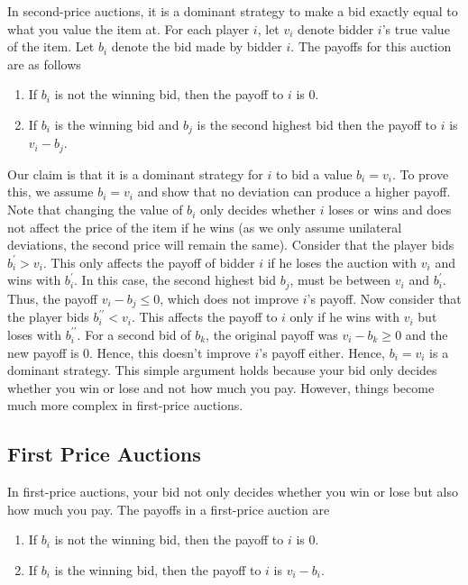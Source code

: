 \documentclass{article}
\theoremstyle{definition}
\begin{document}
In second-price auctions, it is a dominant strategy to make a bid exactly equal to what you value the item at. For each player $i$, let $v_i$ denote bidder $i$'s true value of the item. Let $b_i$ denote the bid made by bidder $i$. The payoffs for this auction are as follows
\begin{enumerate}
    \item If $b_i$ is not the winning bid, then the payoff to $i$ is $0$.
    \item If $b_i$ is the winning bid and $b_j$ is the second highest bid then the payoff to $i$ is $v_i - b_j$.
\end{enumerate}
Our claim is that it is a dominant strategy for $i$ to bid a value $b_i = v_i$. To prove this, we assume $b_i = v_i$ and show that no deviation can produce a higher payoff. Note that changing the value of $b_i$ only decides whether $i$ loses or wins and does not affect the price of the item if he wins (as we only assume unilateral deviations, the second price will remain the same). Consider that the player bids $b^{\prime}_i > v_i$. This only affects the payoff of bidder $i$ if he loses the auction with $v_i$ and wins with $b^{\prime}_i$. In this case, the second highest bid $b_j$, must be between $v_i$ and $b^{\prime}_i$. Thus, the payoff $v_i - b_j \leq 0$, which does not improve $i$'s payoff. Now consider that the player bids $b_i^{\prime \prime} < v_i$. This affects the payoff to $i$ only if he wins with $v_i$ but loses with $b_i^{\prime \prime}$. For a second bid of $b_k$, the original payoff was $v_i - b_k \geq 0$ and the new payoff is $0$. Hence, this doesn't improve $i$'s payoff either. Hence, $b_i = v_i$ is a dominant strategy. This simple argument holds because your bid only decides whether you win or lose and not how much you pay. However, things become much more complex in first-price auctions.

\subsection{First Price Auctions}

In first-price auctions, your bid not only decides whether you win or lose but also how much you pay. The payoffs in a first-price auction are
\begin{enumerate}
    \item If $b_i$ is not the winning bid, then the payoff to $i$ is $0$.
    \item If $b_i$ is the winning bid, then the payoff to $i$ is $v_i - b_i$.
\end{enumerate}
\end{document}
